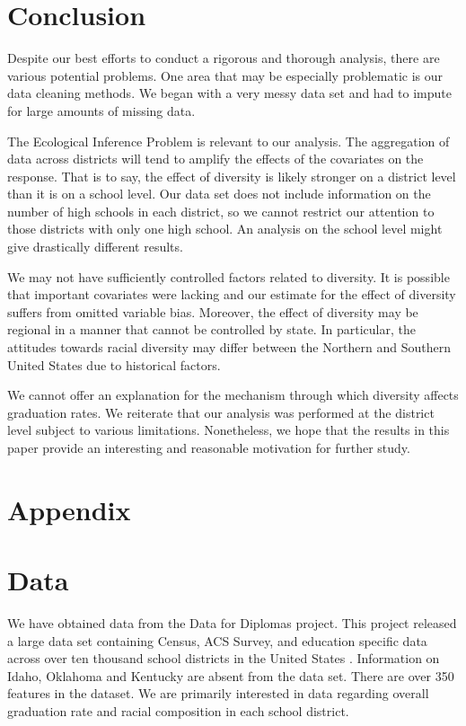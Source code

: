 \documentclass{article}
\begin{document}
\section{Conclusion}

 Despite our best efforts to conduct a rigorous and thorough analysis, there are various potential problems.  One area that may be especially problematic is our data cleaning methods.  We began with a very messy data set and had to impute for large amounts of missing data.
 
 The Ecological Inference Problem is relevant to our analysis. The aggregation of data across districts will tend to amplify the effects of the covariates on the response.  That is to say, the effect of diversity is likely stronger on a district level than it is on a school level.  Our data set does not include information on the number of high schools in each district, so we cannot restrict our attention to those districts with only one high school.  An analysis on the school level might give drastically different results. 
 
We may not have sufficiently controlled factors related to diversity. It is possible that important covariates were lacking and our estimate for the effect of diversity suffers from omitted variable bias.  Moreover, the effect of diversity may be regional in a manner that cannot be controlled by state.  In particular, the attitudes towards racial diversity may differ between the Northern and Southern United States due to historical factors.  
 
 We cannot offer an explanation for the mechanism through which diversity affects graduation rates.  We reiterate that our analysis was performed at the district level subject to various limitations.  Nonetheless, we hope that the results in this paper provide an interesting and reasonable motivation for further study.

\section{Appendix}


\section{Data}

We have obtained data from the Data for Diplomas project. This project released a large data set containing Census, ACS Survey, and education specific data across over ten thousand school districts in the United States \cite{paper4}. Information on Idaho, Oklahoma and Kentucky are absent from the data set. There are over 350 features in the dataset. We are primarily interested in data regarding overall graduation rate and racial composition in each school district.
\end{document}
